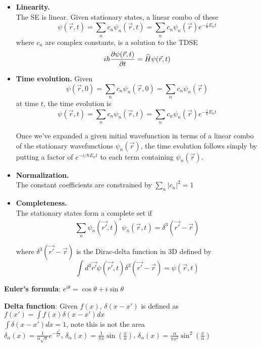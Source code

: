 \begin{itemize}[noitemsep,wide=0pt, leftmargin=\dimexpr{} + 2\relax]
    \item \textbf{Linearity.} \\
        The SE is linear. Given stationary states, a linear combo of these
            $$\psi(\vec{r}, t) = \sum_{n} c_n \psi_n(\vec{r}, t) = \sum_n c_n \psi_n(\vec{r}) e^{-\frac{i}{\hbar} E_n t}$$
        where $c_n$ are complex constants, is a solution to the TDSE 
        $$i \hbar \pdv{\psi(\vec{r}, t)}{t} = \widehat{H} \psi(\vec{r}, t)$$

    \item \textbf{Time evolution.}
        Given $$\psi(\vec{r}, 0) = \sum_n c_n \psi_n(\vec{r}, 0) = \sum_n c_n \psi_n (\vec{r})$$
        at time $t$, the time evolution is 
        $$\psi(\vec{r}, t) = \sum_n c_n \psi_n(\vec{r}, t) = \sum_n c_n \psi_n(\vec{r}) e^{-\frac{i}{\hbar} E_n t}$$

        Once we've expanded a given initial wavefunction in terms of a linear combo of the stationary wavefunctions $\psi_n(\vec{r})$, the time evolution follows simply by putting a factor of $e^{-i/\hbar E_n t}$ to each term containing $\psi_n(\vec{r})$.

    \item \textbf{Normalization.} \\
        The constant coefficients are constrained by $\sum_n |c_n|^2 = 1$

    \item \textbf{Completeness.} \\
        The stationary states form a complete set if
            $$\sum_n \psi_n (\vec{r'}, t)^* \psi_{n} (\vec{r}, t) = \delta^3 (\vec{r'} - \vec{r})$$

        where $\delta^3(\vec{r'} - \vec{r})$ is the Dirac-delta function in 3D defined by $$\int d^3 \vec{r'} \psi(\vec{r'}, t) \delta^3(\vec{r'} - \vec{r}) = \psi(\vec{r}, t)$$
\end{itemize}

\textbf{Euler's formula}: $e^{i \theta} = \cos \theta + i \sin \theta$

\textbf{Delta function}: Given $f(x)$, $\delta(x - x')$ is defined as $f(x') = \int f(x) \delta(x - x') dx$ \\
$\int \delta(x - x') dx = 1$, note this is not the area \\

    $\delta_{\alpha}(x) = \frac{1}{\alpha \sqrt{\pi}} e^{-\frac{x^2}{\alpha^2}}$,
    $\delta_{\alpha}(x) = \frac{1}{\pi x} \sin(\frac{x}{a})$, 
    $\delta_{\alpha}(x) = \frac{\alpha}{\pi x^2} \sin^2 (\frac{x}{\alpha})$ \\

